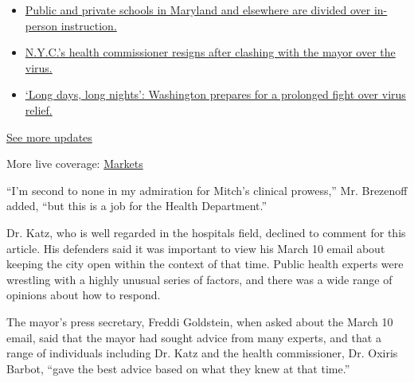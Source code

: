 \begin{itemize}
\tightlist
\item
  \href{https://www.nytimes3xbfgragh.onion/2020/08/04/world/coronavirus-cases.html?action=click\&pgtype=Article\&state=default\&region=MAIN_CONTENT_1\&context=storylines_live_updates\#link-4825b93}{Public
  and private schools in Maryland and elsewhere are divided over
  in-person instruction.}
\item
  \href{https://www.nytimes3xbfgragh.onion/2020/08/04/world/coronavirus-cases.html?action=click\&pgtype=Article\&state=default\&region=MAIN_CONTENT_1\&context=storylines_live_updates\#link-4d1eafa8}{N.Y.C.'s
  health commissioner resigns after clashing with the mayor over the
  virus.}
\item
  \href{https://www.nytimes3xbfgragh.onion/2020/08/04/world/coronavirus-cases.html?action=click\&pgtype=Article\&state=default\&region=MAIN_CONTENT_1\&context=storylines_live_updates\#link-6b644638}{`Long
  days, long nights': Washington prepares for a prolonged fight over
  virus relief.}
\end{itemize}

\href{https://www.nytimes3xbfgragh.onion/2020/08/04/world/coronavirus-cases.html?action=click\&pgtype=Article\&state=default\&region=MAIN_CONTENT_1\&context=storylines_live_updates}{See
more updates}

More live coverage:
\href{https://www.nytimes3xbfgragh.onion/live/2020/08/04/business/stock-market-today-coronavirus?action=click\&pgtype=Article\&state=default\&region=MAIN_CONTENT_1\&context=storylines_live_updates}{Markets}

``I'm second to none in my admiration for Mitch's clinical prowess,''
Mr. Brezenoff added, ``but this is a job for the Health Department.''

Dr. Katz, who is well regarded in the hospitals field, declined to
comment for this article. His defenders said it was important to view
his March 10 email about keeping the city open within the context of
that time. Public health experts were wrestling with a highly unusual
series of factors, and there was a wide range of opinions about how to
respond.

The mayor's press secretary, Freddi Goldstein, when asked about the
March 10 email, said that the mayor had sought advice from many experts,
and that a range of individuals including Dr. Katz and the health
commissioner, Dr. Oxiris Barbot, ``gave the best advice based on what
they knew at that time.''

